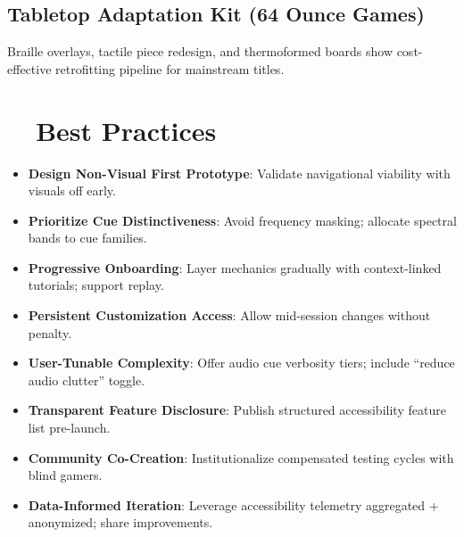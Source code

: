 \subsection*{Tabletop Adaptation Kit (64 Ounce Games)}
Braille overlays, tactile piece redesign, and thermoformed boards show cost-effective retrofitting pipeline for mainstream titles\supercite{64OunceGames}.

\section{~~Best Practices}
\label{sec:gaming-best-practices}
\begin{itemize}
	\item \textbf{Design Non-Visual First Prototype}: Validate navigational viability with visuals off early.
	\item \textbf{Prioritize Cue Distinctiveness}: Avoid frequency masking; allocate spectral bands to cue families.
	\item \textbf{Progressive Onboarding}: Layer mechanics gradually with context-linked tutorials; support replay.
	\item \textbf{Persistent Customization Access}: Allow mid-session changes without penalty.
	\item \textbf{User-Tunable Complexity}: Offer audio cue verbosity tiers; include “reduce audio clutter” toggle.
	\item \textbf{Transparent Feature Disclosure}: Publish structured accessibility feature list pre-launch.
	\item \textbf{Community Co-Creation}: Institutionalize compensated testing cycles with blind gamers\supercite{ResearchGateInclusiveGames}.
	\item \textbf{Data-Informed Iteration}: Leverage accessibility telemetry aggregated + anonymized; share improvements.
\end{itemize}

